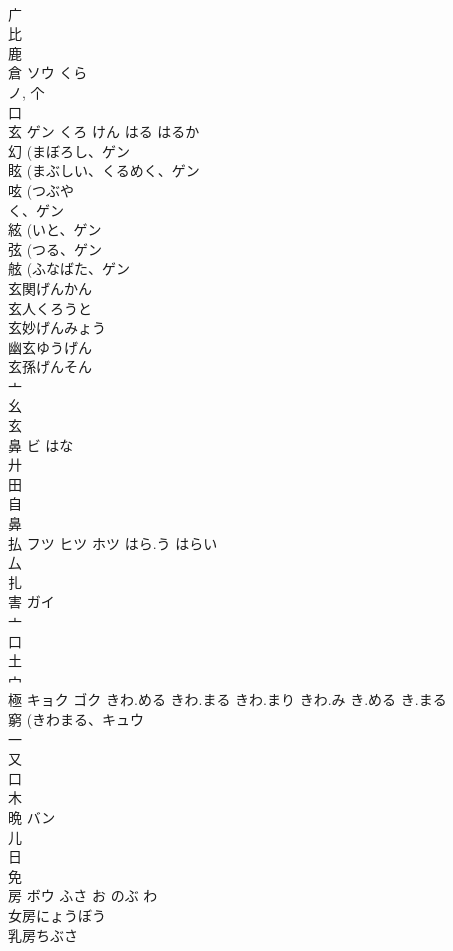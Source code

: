 \documentclass[8pt]{extreport}
\begin{document}
\begin{CJK}{UTF8}{min}
\\	广 
\\	比 
\\	鹿 
\\	倉	ソウ	くら	
\\	ノ, 个 
\\	口 
\\	玄	ゲン	くろ けん はる はるか	
\\	幻 (まぼろし、ゲン 
\\	眩 (まぶしい、くるめく、ゲン 
\\	呟 (つぶや
\\	く、ゲン 
\\	絃 (いと、ゲン 
\\	弦 (つる、ゲン 
\\	舷 (ふなばた、ゲン 
\\	玄関げんかん
\\	玄人くろうと
\\	玄妙げんみょう
\\	幽玄ゆうげん
\\	玄孫げんそん
\\	亠 
\\	幺 
\\	玄 
\\	鼻	ビ	はな	
\\	廾 
\\	田 
\\	自 
\\	鼻 
\\	払	フツ ヒツ ホツ	はら.う はらい	
\\	厶 
\\	扎	
\\	害	ガイ		
\\	亠 
\\	口 
\\	土 
\\	宀 
\\	極	キョク ゴク	きわ.める きわ.まる きわ.まり きわ.み き.める き.まる	
\\	窮 (きわまる、キュウ 
\\	一 
\\	又 
\\	口 
\\	木 
\\	晩	バン		
\\	儿 
\\	日 
\\	免 
\\	房	ボウ	ふさ お のぶ わ	
\\	女房にょうぼう
\\	乳房ちぶさ

\end{CJK}
\end{document}
